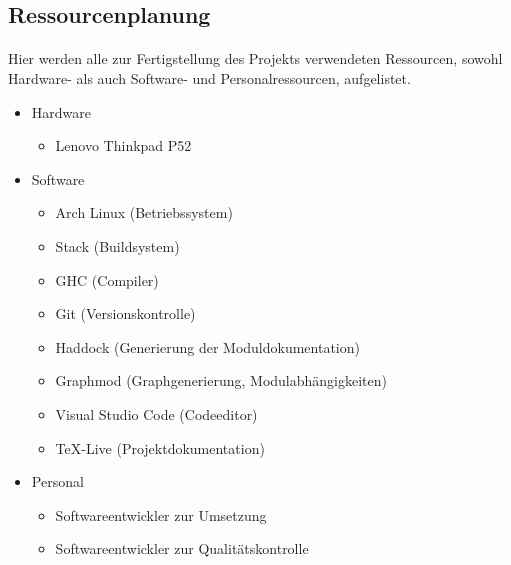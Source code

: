 \subsection{Ressourcenplanung}
\paragraph{}
Hier werden alle zur Fertigstellung des Projekts verwendeten Ressourcen, sowohl
Hardware- als auch Software- und Personalressourcen, aufgelistet.

\begin{itemize}
    \item Hardware \begin{itemize}
              \item Lenovo Thinkpad P52
          \end{itemize}
    \item Software \begin{itemize}
              \item Arch Linux (Betriebssystem)
              \item Stack (Buildsystem)
              \item GHC (Compiler)
              \item Git (Versionskontrolle)
              \item Haddock (Generierung der Moduldokumentation)
              \item Graphmod (Graphgenerierung, Modulabhängigkeiten)
              \item Visual Studio Code (Codeeditor)
              \item \TeX -Live (Projektdokumentation)
          \end{itemize}
    \item Personal \begin{itemize}
              \item Softwareentwickler zur Umsetzung
              \item Softwareentwickler zur Qualitätskontrolle
          \end{itemize}
\end{itemize}